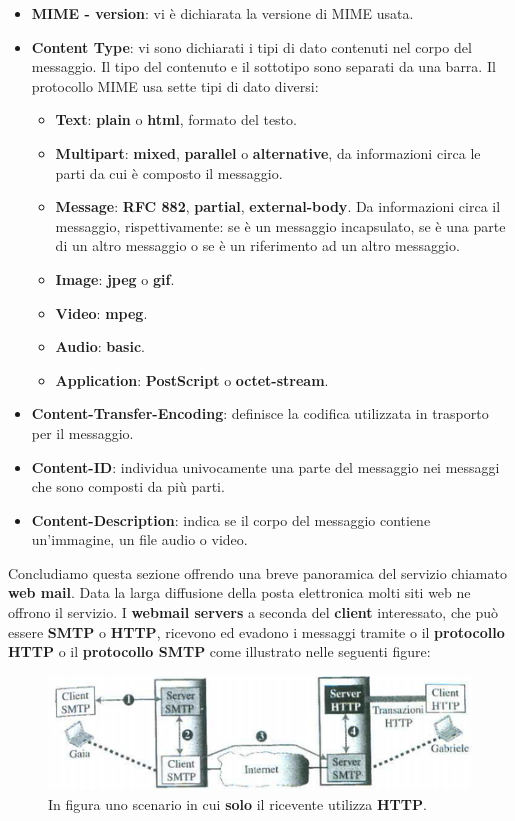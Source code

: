 \documentclass[11pt,a4paper]{article}
\theoremstyle{definition}
\begin{document}
\begin{itemize}
	\item \textbf{MIME - version}: vi è dichiarata la versione di MIME usata.
	\item \textbf{Content Type}: vi sono dichiarati i tipi di dato contenuti nel corpo del messaggio. Il tipo del contenuto e il sottotipo sono separati da una barra. Il protocollo MIME usa sette tipi di dato diversi:
	      \begin{itemize}
		      \item \textbf{Text}: \textbf{plain} o \textbf{html}, formato del testo.
		      \item \textbf{Multipart}: \textbf{mixed}, \textbf{parallel} o \textbf{alternative}, da informazioni circa le parti da cui è composto il messaggio.
		      \item \textbf{Message}: \textbf{RFC 882}, \textbf{partial}, \textbf{external-body}. Da informazioni circa il messaggio, rispettivamente: se è un messaggio incapsulato, se è una parte di un altro messaggio o se è un riferimento ad un altro messaggio.
		      \item \textbf{Image}: \textbf{jpeg} o \textbf{gif}.
		      \item \textbf{Video}: \textbf{mpeg}.
		      \item \textbf{Audio}: \textbf{basic}.
		      \item \textbf{Application}: \textbf{PostScript} o \textbf{octet-stream}.
	      \end{itemize}
	\item \textbf{Content-Transfer-Encoding}: definisce la codifica utilizzata in trasporto per il messaggio.
	\item \textbf{Content-ID}: individua univocamente una parte del messaggio nei messaggi che sono composti da più parti.
	\item \textbf{Content-Description}: indica se il corpo del messaggio contiene un'immagine, un file audio o video.
\end{itemize}
\newpage
Concludiamo questa sezione offrendo una breve panoramica del servizio chiamato \textbf{web mail}. Data la larga diffusione della posta elettronica molti siti web ne offrono il servizio. I \textbf{webmail servers} a seconda del \textbf{client} interessato, che può essere \textbf{SMTP} o \textbf{HTTP}, ricevono ed evadono i messaggi tramite o il \textbf{protocollo HTTP} o il \textbf{protocollo SMTP} come illustrato nelle seguenti figure:
\begin{figure}[!h]
	\includegraphics[scale=0.6]{Immagini/Web_mail.png}
	\centering
	\caption{In figura uno scenario in cui \textbf{solo} il ricevente utilizza \textbf{HTTP}.}
\end{figure}
\end{document}

